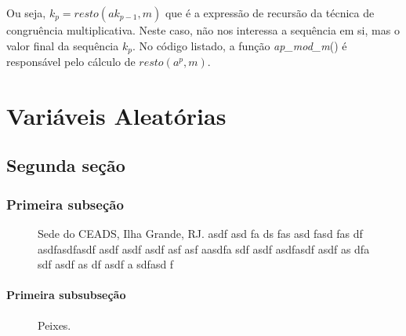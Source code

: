 \documentclass[a4paper,12pt,oneside,onecolumn]{uerj}
\begin{document}
Ou seja, $k_p = resto(ak_{p-1},m)$ que é a expressão de recursão da técnica de congruência multiplicativa. Neste caso, não nos interessa a sequência em si, mas o valor final da sequência $k_p$. No código listado, a função \emph{ap\_mod\_m}() é responsável pelo cálculo de $resto(a^{p},m)$.

\chapter{Variáveis Aleatórias}

\section{Segunda seção}

\subsection{Primeira subseção}

\begin{figure}[ht]
  \centering
  \caption{Sede do CEADS, Ilha Grande, RJ. asdf asd fa ds fas asd fasd fas df asdfasdfasdf asdf asdf asdf asf asf aasdfa sdf   asdf asdfasdf asdf as dfa sdf asdf as df asdf a sdfasd f}
  \label{fig:ceads1}
\end{figure}

\subsubsection{Primeira subsubseção}

\begin{figure}[ht]
  \centering
  \caption{Peixes.}
  \label{fig:peixes}
\end{figure}
\end{document}
